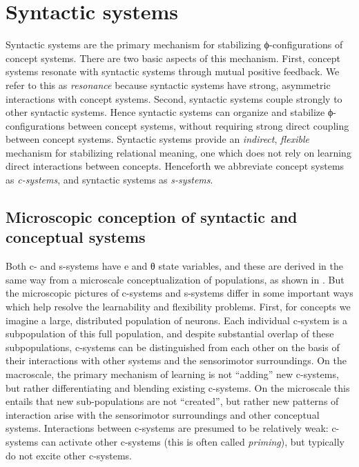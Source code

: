 \section{Syntactic systems}

Syntactic systems are the primary mechanism for stabilizing ϕ-configurations of concept systems. There are two basic aspects of this mechanism. First, concept systems resonate with syntactic systems through mutual positive feedback. We refer to this as \textit{resonance} because syntactic systems have strong, asymmetric interactions with concept systems. Second, syntactic systems couple strongly to other syntactic systems. Hence syntactic systems can organize and stabilize ϕ-configurations between concept systems, without requiring strong direct coupling between concept systems. Syntactic systems provide an \textit{indirect}, \textit{flexible} mechanism for stabilizing relational meaning, one which does not rely on learning direct interactions between concepts. Henceforth we abbreviate concept systems as \textit{c-systems}, and syntactic systems as \textit{s-systems}. 

\subsection{Microscopic conception of syntactic and conceptual systems}

Both c- and s-systems have e and θ state variables, and these are derived in the same way from a microscale conceptualization of populations, as shown in {}. But the microscopic pictures of c-systems and s-systems differ in some important ways which help resolve the learnability and flexibility problems. First, for concepts we imagine a large, distributed population of neurons. Each individual c-system is a subpopulation of this full population, and despite substantial overlap of these subpopulations, c-systems can be distinguished from each other on the basis of their interactions with other systems and the sensorimotor surroundings. On the macroscale, the primary mechanism of learning is not “adding” new c-systems, but rather differentiating and blending existing c-systems. On the microscale this entails that new sub-populations are not “created”, but rather new patterns of interaction arise with the sensorimotor surroundings and other conceptual systems. Interactions between c-systems are presumed to be relatively weak: c-systems can activate other c-systems (this is often called \textit{priming}), but typically do not excite other c-systems.

